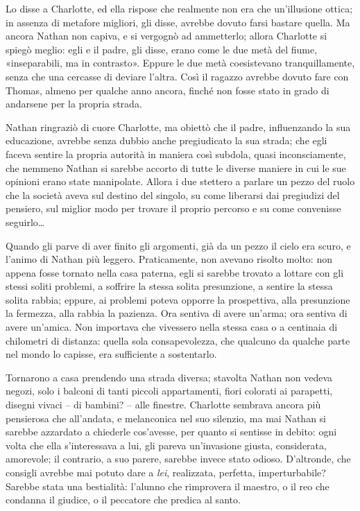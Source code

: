 \documentclass[a4paper,oneside,11pt]{memoir}
\begin{document}
Lo disse a Charlotte, ed ella rispose che realmente non era che un'illusione
ottica; in assenza di metafore migliori, gli disse, avrebbe dovuto farsi bastare
quella. Ma ancora Nathan non capiva, e si vergognò ad ammetterlo; allora
Charlotte si spiegò meglio: egli e il padre, gli disse, erano come le due metà
del fiume, «inseparabili, ma in contrasto». Eppure le due metà coesistevano
tranquillamente, senza che una cercasse di deviare l'altra. Così il ragazzo
avrebbe dovuto fare con Thomas, almeno per qualche anno ancora, finché non fosse
stato in grado di andarsene per la propria strada.

Nathan ringraziò di cuore Charlotte, ma obiettò che il padre, influenzando la
sua educazione, avrebbe senza dubbio anche pregiudicato la sua strada; che egli
faceva sentire la propria autorità in maniera così subdola, quasi
inconsciamente, che nemmeno Nathan si sarebbe accorto di tutte le diverse
maniere in cui le sue opinioni erano state manipolate. Allora i due stettero a
parlare un pezzo del ruolo che la società aveva sul destino del singolo, su come
liberarsi dai pregiudizi del pensiero, sul miglior modo per trovare il proprio
percorso e su come convenisse seguirlo\dots

Quando gli parve di aver finito gli argomenti, già da un pezzo il cielo era
scuro, e l'animo di Nathan più leggero. Praticamente, non avevano risolto molto:
non appena fosse tornato nella casa paterna, egli si sarebbe trovato a lottare
con gli stessi soliti problemi, a soffrire la stessa solita presunzione, a
sentire la stessa solita rabbia; eppure, ai problemi poteva opporre la
prospettiva, alla presunzione la fermezza, alla rabbia la pazienza. Ora sentiva
di avere un'arma; ora sentiva di avere un'amica. Non importava che vivessero
nella stessa casa o a centinaia di chilometri di distanza: quella sola
consapevolezza, che qualcuno da qualche parte nel mondo lo capisse, era
sufficiente a sostentarlo.

Tornarono a casa prendendo una strada diversa; stavolta Nathan non vedeva
negozi, solo i balconi di tanti piccoli appartamenti, fiori colorati ai
parapetti, disegni vivaci -- di bambini? -- alle finestre. Charlotte sembrava
ancora più pensierosa che all'andata, e melanconica nel suo silenzio, ma mai
Nathan si sarebbe azzardato a chiederle cos'avesse, per quanto si sentisse in
debito: ogni volta che ella s'interessava a lui, gli pareva un'invasione giusta,
considerata, amorevole; il contrario, a suo parere, sarebbe invece stato odioso.
D'altronde, che consigli avrebbe mai potuto dare a \emph{lei}, realizzata,
perfetta, imperturbabile? Sarebbe stata una bestialità: l'alunno che rimprovera
il maestro, o il reo che condanna il giudice, o il peccatore che predica al
santo.
\end{document}
